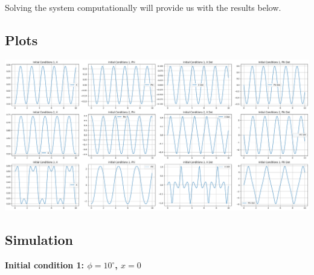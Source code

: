\documentclass{article}
\begin{document}
Solving the system computationally will provide us with the results below.


\subsection{Plots}
\includegraphics[scale=0.25]{plots/task2_plots.png}


\subsection{Simulation}


\textbf{Initial condition 1: $\phi = 10^\circ$, $x = 0$}
\end{document}
